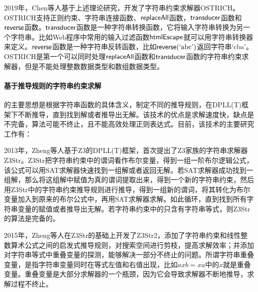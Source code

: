 2019年，Chen等人基于上述理论研究，开发了字符串约束求解器OSTRICH\cite{ostrich}。OSTRICH支持正则约束、字符串连接函数、$\mathsf{replaceAll}$函数，$\mathsf{transducer}$函数和$\mathsf{reverse}$函数。$\mathsf{transducer}$函数是一种字符串转换函数，它将输入字符串转换为另一个字符串。比如Web程序中常用的输入过滤函数$\mathsf{htmlEscape}$就可以用字符串转换器来定义。$\mathsf{reverse}$函数是一种字符串反转函数，比如$\mathsf{reverse}(\text{‘abc’})$返回字符串‘cba’。OSTRICH是第一个可以同时处理$\mathsf{replaceAll}$函数和$\mathsf{transducer}$函数的字符串约束求解器，但是不能处理整数数据类型和数组数据类型。




\paragraph{基于推导规则的字符串约束求解} 的主要思想是根据字符串函数的具体含义，制定不同的推导规则，在DPLL(T)框架\cite{dpll_t}下不断推导，直到找到解或者推导出无解。该技术的优点是求解速度快，缺点是不完备，算法可能不终止，且不能高效处理正则表达式。目前，该技术的主要研究工作有：

2013年，Zheng等人\cite{z3str}基于Z3的DPLL(T)框架，首次提出了Z3\cite{z3}家族的字符串求解器Z3Str。Z3Str把字符串约束中的谓词看作布尔变量，得到一组一阶布尔逻辑公式，该公式可以用SAT求解器快速找到一组解或者返回无解。若SAT求解器成功找到一组解，那么将这组解中赋值为真的谓词提取出来，得到一个新的字符串约束，然后用Z3Str中的字符串约束推导规则进行推导，得到一组新的谓词，将其转化为布尔变量加入到原来的布尔公式中，再用SAT求解器求解。如此循环，直到找到所有字符串变量的赋值或者推导出无解。若字符串约束中的只含有字符串等式，则Z3Str的算法是完备的。

2015年，Zheng等人\cite{z3str2}在Z3Str的基础上开发了Z3Str2，添加了字符串约束和线性整数算术公式之间的启发式推导规则，对搜索空间进行剪枝，提高求解效率；并添加对字符串等式中重叠变量的探测，能够解决一部分不终止的问题。所谓字符串重叠变量，是指字符串变量同时在等式左值和右值出现，比如$axb=xa$中的$x$就是重叠变量。重叠变量是大部分求解器的一个瓶颈，因为它会导致求解器不断地推导，求解过程不终止。

